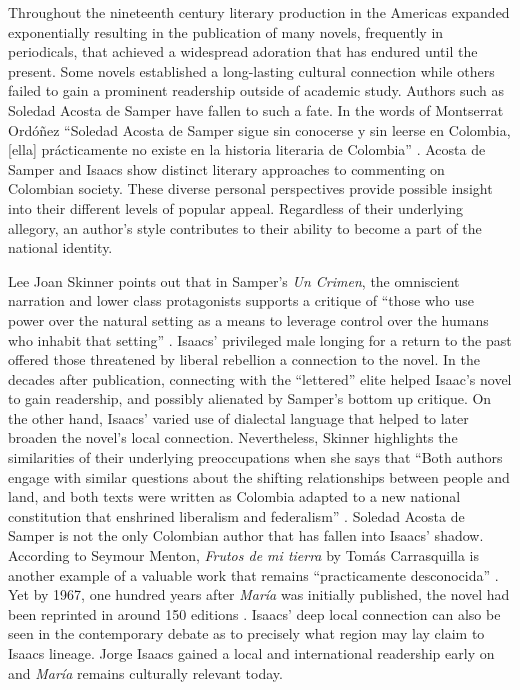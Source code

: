 Throughout the nineteenth century literary production in the Americas expanded exponentially resulting in the publication of many novels, frequently in periodicals, that achieved a widespread adoration that has endured until the present. 
Some novels established a long-lasting cultural connection while others failed to gain a prominent readership outside of academic study. 
Authors such as Soledad Acosta de Samper have fallen to such a fate. 
In the words of Montserrat Ordóñez \enquote{Soledad Acosta de Samper sigue sin conocerse y sin leerse en Colombia, [ella] prácticamente no existe en la historia literaria de Colombia} \autocite[257]{Ordonez2005}. 
Acosta de Samper and Isaacs show distinct literary approaches to commenting on Colombian society.
These diverse personal perspectives provide possible insight into their different levels of popular appeal.
Regardless of their underlying allegory, an author’s style contributes to their ability to become a part of the national identity. 

Lee Joan Skinner points out that in Samper's \textit{Un Crimen}, the omniscient narration and lower class protagonists supports a critique of  \enquote{those who use power over the natural setting as a means to leverage control over the humans who inhabit that setting} \autocite[19]{Skinner2014}.
Isaacs’ privileged male longing for a return to the past offered those threatened by liberal rebellion a connection to the novel.
In the decades after publication, connecting with the \enquote{lettered} elite helped Isaac's novel to gain readership, and possibly alienated by Samper's bottom up critique.
On the other hand, Isaacs’ varied use of dialectal language that helped to later broaden the novel's local connection. 
Nevertheless, Skinner highlights the similarities of their underlying preoccupations when she says that \enquote{Both authors engage with similar questions about the shifting relationships between people and land, and both texts were written as Colombia adapted to a new national constitution that enshrined liberalism and federalism} \autocite[13]{Skinner2014}.
Soledad Acosta de Samper is not the only Colombian author that has fallen into Isaacs' shadow.
According to Seymour Menton, \textit{Frutos de mi tierra} by Tomás Carrasquilla is another example of a valuable work that remains \enquote{practicamente desconocida} \autocite[111]{Menton1978}. 
Yet by 1967, one hundred years after \textit{María} was initially published, the novel had been reprinted in around 150 editions \autocite[13]{McGrady2012}. 
Isaacs' deep local connection can also be seen in the contemporary debate as to precisely what region may lay claim to Isaacs lineage. 
Jorge Isaacs gained a local and international readership early on and \textit{María} remains culturally relevant today. 


